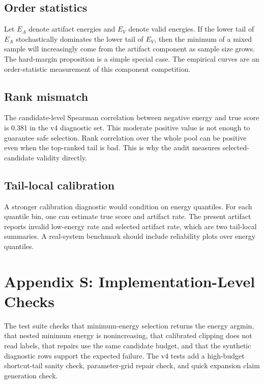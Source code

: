 \documentclass{article}
\begin{document}
\subsection{Order statistics}

Let $E_A$ denote artifact energies and $E_V$ denote valid energies. If the lower
tail of $E_A$ stochastically dominates the lower tail of $E_V$, then the
minimum of a mixed sample will increasingly come from the artifact component as
sample size grows. The hard-margin proposition is a simple special case. The
empirical curves are an order-statistic measurement of this component
competition.

\subsection{Rank mismatch}

The candidate-level Spearman correlation between negative energy and true
score is 0.381 in the v4 diagnostic set. This moderate positive value is not
enough to guarantee safe selection. Rank correlation over the whole pool can be
positive even when the top-ranked tail is bad. This is why the audit measures
selected-candidate validity directly.

\subsection{Tail-local calibration}

A stronger calibration diagnostic would condition on energy quantiles. For
each quantile bin, one can estimate true score and artifact rate. The present
artifact reports invalid low-energy rate and selected artifact rate, which are
two tail-local summaries. A real-system benchmark should include reliability
plots over energy quantiles.

\section{Appendix S: Implementation-Level Checks}

The test suite checks that minimum-energy selection returns the energy argmin,
that nested minimum energy is nonincreasing, that calibrated clipping does not
read labels, that repairs use the same candidate budget, and that the synthetic
diagnostic rows support the expected failure. The v4 tests add a high-budget
shortcut-tail sanity check, parameter-grid repair check, and quick expansion
claim generation check.
\end{document}
